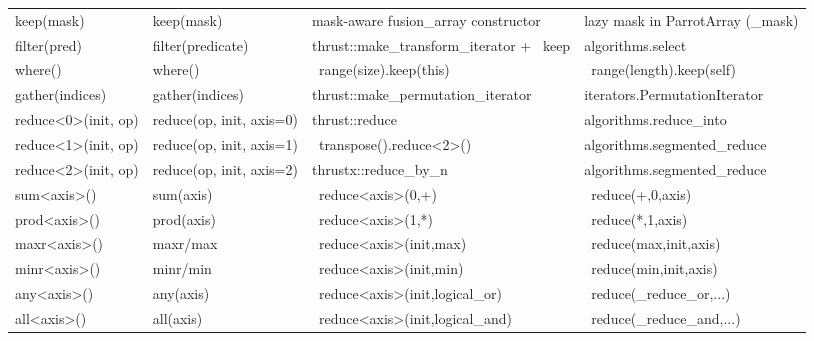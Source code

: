 \documentclass[10pt]{article}
\newcommand{\parrotemoji}{{\emojifont\normalsize\symbol{"1F99C}}}
\newcommand{\parrotimpl}{\parrotemoji}
\begin{document}
\begin{minipage}{\textwidth}
\begin{tabularx}{\textwidth}{ll>{\raggedright\arraybackslash}X>{\raggedright\arraybackslash}X}
keep(mask) & keep(mask) & mask-aware fusion\_array constructor & lazy mask in ParrotArray (\_mask) \\
filter(pred) & filter(predicate) & thrust::make\_transform\_iterator + \parrotimpl\ keep & algorithms.select \\
where() & where() & \parrotimpl\ range(size).keep(this) & \parrotimpl\ range(length).keep(self) \\
gather(indices) & gather(indices) & thrust::make\_permutation\_iterator & iterators.PermutationIterator \\
reduce<0>(init, op) & reduce(op, init, axis=0) & thrust::reduce & algorithms.reduce\_into \\
reduce<1>(init, op) & reduce(op, init, axis=1) & \parrotimpl\ transpose().reduce<2>() & algorithms.segmented\_reduce \\
reduce<2>(init, op) & reduce(op, init, axis=2) & thrustx::reduce\_by\_n & algorithms.segmented\_reduce \\
sum<axis>() & sum(axis) & \parrotimpl\ reduce<axis>(0,+) & \parrotimpl\ reduce(+,0,axis) \\
prod<axis>() & prod(axis) & \parrotimpl\ reduce<axis>(1,*) & \parrotimpl\ reduce(*,1,axis) \\
maxr<axis>() & maxr/max & \parrotimpl\ reduce<axis>(init,max) & \parrotimpl\ reduce(max,init,axis) \\
minr<axis>() & minr/min & \parrotimpl\ reduce<axis>(init,min) & \parrotimpl\ reduce(min,init,axis) \\
any<axis>() & any(axis) & \parrotimpl\ reduce<axis>(init,logical\_or) & \parrotimpl\ reduce(\_reduce\_or,...) \\
all<axis>() & all(axis) & \parrotimpl\ reduce<axis>(init,logical\_and) & \parrotimpl\ reduce(\_reduce\_and,...) \\
\bottomrule
\end{tabularx}
\end{minipage}

\vspace{1.5em}
\end{document}
